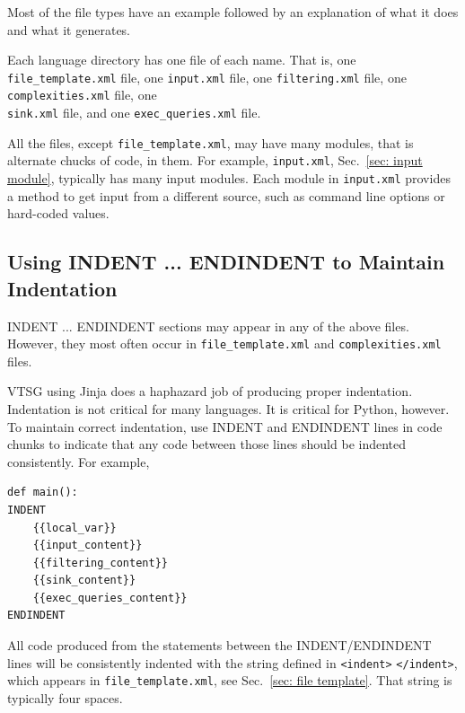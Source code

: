 \documentclass[12pt]{article}
\begin{document}
Most of the file types have an example followed by
an explanation of what it does and what it generates.

Each language directory has one file of each name. That is,
one \verb|file_template.xml| file, one \verb|input.xml| file, 
one \verb|filtering.xml| file, one \verb|complexities.xml| file,
one \\ \verb|sink.xml| file, and one \verb|exec_queries.xml| file.

All the files, except \verb|file_template.xml|, may have many
modules, that is alternate chucks of code, in them.
For example, \verb|input.xml|, Sec.~\ref{sec: input module}, typically has many input
modules.  Each module in \verb|input.xml| provides a method to get input from a
different source, such as command line options or hard-coded values.

\subsection{Using INDENT ... ENDINDENT to Maintain Indentation}
\label{sec:indent}

INDENT ... ENDINDENT sections may appear in any of the above files.  However, they
most often occur in \verb|file_template.xml| and \verb|complexities.xml| files.

VTSG using Jinja does a haphazard job of producing proper indentation.  Indentation
is not critical for many languages.  It is critical for Python, however.  To maintain
correct indentation, use INDENT and ENDINDENT lines in code chunks to indicate that
any code between those lines should be indented consistently.  For example,
\begin{verbatim}
def main():
INDENT
    {{local_var}}
    {{input_content}}
    {{filtering_content}}
    {{sink_content}}
    {{exec_queries_content}}
ENDINDENT
\end{verbatim}
All code produced from the statements between the INDENT/ENDINDENT lines will be
consistently indented with the string defined in \verb|<indent>| \verb|</indent>|,
which appears in \verb|file_template.xml|, see Sec.~\ref{sec: file template}.
That string is typically four spaces.
\end{document}
